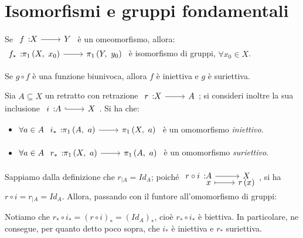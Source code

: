 \section{Isomorfismi e gruppi fondamentali}
\begin{corollary}
	Se $\funz{f}{X}{Y}$ è un omeomorfismo, allora:\\ $\funz{f_{\ast}}{\gruf{X}{x_0}}{\gruf{Y}{y_0}}$ è isomorfismo di gruppi, $\forall x_0\in X$.
\end{corollary}
\begin{remember}
	Se $g\circ f$ è una funzione biunivoca, allora $f$ è iniettiva e $g$ è suriettiva.
\end{remember}
\begin{corollary}\label{grp fond iniettiva e suriettiva}
	Sia $A\subseteq X$ un retratto con retrazione $\funz{r}{X}{A}$; si consideri inoltre la sua inclusione $\incl{i}{A}{X}$. Si ha che:
	\begin{itemize}
		\item $\forall a\in A\ \funz{i_{\ast}}{\gruf{A}{a}}{\gruf{X}{a}}$ è un omomorfismo \textit{iniettivo}.
		\item $\forall a\in A\ \funz{r_{\ast}}{\gruf{X}{a}}{\gruf{A}{a}}$ è un omomorfismo \textit{suriettivo}.
	\end{itemize}
\end{corollary}
\begin{demonstration}
	Sappiamo dalla definizione che $r_{\mid A}=Id_A$; poiché $\funztot{r\circ i}{A}{X}{x}{r\left(x\right)}$, si ha $r\circ i=r_{\mid A}=Id_A$. Allora, passando con il funtore all'omomorfismo di gruppi:
	\begin{center}
	\end{center}
Notiamo che $r_{\ast}\circ i_{\ast}=\left(r\circ i\right)_{\ast}=\left(Id_A\right)_{\ast}$, cioè $r_{\ast}\circ i_{\ast}$ è biettiva. In particolare, ne consegue, per quanto detto poco sopra, che $i_{\ast}$ è iniettiva e $r_{\ast}$ suriettiva.
\end{demonstration}
